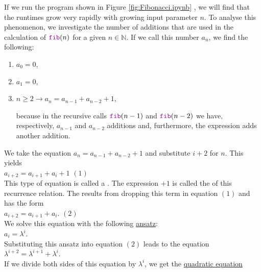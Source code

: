 If we run the program shown in Figure \ref{fig:Fibonacci.ipynb} , we will find that the runtimes grow very rapidly with
growing input parameter $n$.  To analyse this phenomenon, we investigate the number of additions that are used in the
calculation of $\mytt{fib}(n)$ for a given $n \in \mathbb{N}$.  If we call this number $a_n$, we find
the following:
\begin{enumerate}
\item $a_0 = 0$,
\item $a_1 = 0$,
\item $n \geq 2 \rightarrow a_n = a_{n-1} + a_{n-2} + 1$,

      because in the recursive calls $\mytt{fib}(n-1)$ and $\mytt{fib}(n-2)$ we have, respectively, 
      $a_{n-1}$ and $a_{n-2}$ additions and, furthermore, the expression
       adds another addition.
\end{enumerate}
We take the equation $a_n = a_{n-1} + a_{n-2} + 1$ and substitute $i+2$ for $n$.  This yields
\\[0.2cm]
\hspace*{1.3cm} $a_{i+2} = a_{i+1} + a_i + 1$ \hspace*{\fill} $(1)$
\\[0.2cm]
This type of equation is called a .  The expression $+ 1$ is
called the  of this recurrence relation.
The  
results from dropping this term in equation $(1)$ and has the form
\\[0.2cm]
\hspace*{1.3cm}
$a_{i+2} = a_{i+1} + a_i$. \hspace*{\fill} $(2)$
\\[0.2cm]
We solve this equation with the following \href{https://en.oxforddictionaries.com/definition/ansatz}{ansatz}:
\\[0.2cm]
\hspace*{1.3cm} $a_i = \lambda^i$. \\[0.2cm]
Substituting this ansatz into equation $(2)$ leads to the equation 
\\[0.2cm]
\hspace*{1.3cm}
$\lambda^{i+2} = \lambda^{i+1} + \lambda^i$.
\\[0.2cm]
If we divide both sides of this equation by $\lambda^i$, we get the
\href{https://en.wikipedia.org/wiki/Quadratic_equation}{quadratic equation}
